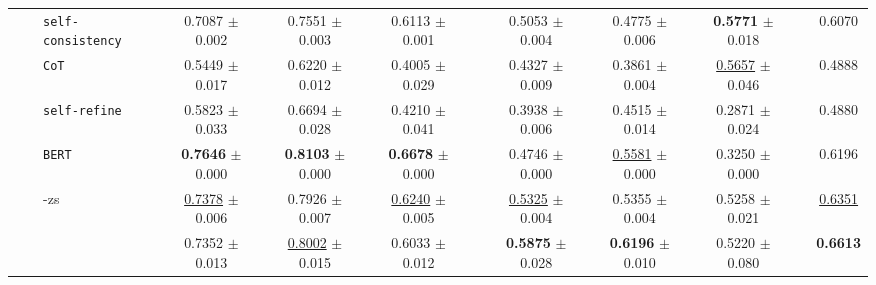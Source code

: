 \begin{table}[ht]
\begin{adjustbox}{max width=\textwidth}
\begin{tabular}{@{}l l l ccc p{0.15cm} ccc p{0.15cm} c@{}}
        & & \cellcolor{altrow} \texttt{self-consistency}       & \cellcolor{altrow} 0.7087 {\tiny$\pm$ 0.002} & \cellcolor{altrow} 0.7551 {\tiny$\pm$ 0.003} & \cellcolor{altrow} 0.6113 {\tiny$\pm$ 0.001}  & & \cellcolor{altrow} 0.5053 {\tiny$\pm$ 0.004} & \cellcolor{altrow} 0.4775 {\tiny$\pm$ 0.006} & \cellcolor{altrow} \textbf{0.5771} {\tiny$\pm$ 0.018}  & & \cellcolor{avgall!85}0.6070 \\
        & & \cellcolor{white} \texttt{CoT}                    & \cellcolor{white} 0.5449 {\tiny$\pm$ 0.017} & \cellcolor{white} 0.6220 {\tiny$\pm$ 0.012} & \cellcolor{white} 0.4005 {\tiny$\pm$ 0.029}  & & \cellcolor{white} 0.4327 {\tiny$\pm$ 0.009} & \cellcolor{white} 0.3861 {\tiny$\pm$ 0.004} & \cellcolor{white} \underline{0.5657} {\tiny$\pm$ 0.046}  & & \cellcolor{avgall!85}0.4888 \\
        & & \cellcolor{altrow} \texttt{self-refine}            & \cellcolor{altrow} 0.5823 {\tiny$\pm$ 0.033} & \cellcolor{altrow} 0.6694 {\tiny$\pm$ 0.028} & \cellcolor{altrow} 0.4210 {\tiny$\pm$ 0.041}  & & \cellcolor{altrow} 0.3938 {\tiny$\pm$ 0.006} & \cellcolor{altrow} 0.4515 {\tiny$\pm$ 0.014} & \cellcolor{altrow} 0.2871 {\tiny$\pm$ 0.024}  & & \cellcolor{avgall!85}0.4880 \\
        & & \cellcolor{white} \texttt{BERT}                   & \cellcolor{white} \textbf{0.7646} {\tiny$\pm$ 0.000} & \cellcolor{white} \textbf{0.8103} {\tiny$\pm$ 0.000} & \cellcolor{white} \textbf{0.6678} {\tiny$\pm$ 0.000}  & & \cellcolor{white} 0.4746 {\tiny$\pm$ 0.000} & \cellcolor{white} \underline{0.5581} {\tiny$\pm$ 0.000} & \cellcolor{white} 0.3250 {\tiny$\pm$ 0.000}  & & \cellcolor{avgall!85}0.6196 \\
        & & \cellcolor{methodrow} \method{}-zs          & \cellcolor{methodrow} \underline{0.7378} {\tiny$\pm$ 0.006} & \cellcolor{methodrow} 0.7926 {\tiny$\pm$ 0.007} & \cellcolor{methodrow} \underline{0.6240} {\tiny$\pm$ 0.005}  & & \cellcolor{methodrow} \underline{0.5325} {\tiny$\pm$ 0.004} & \cellcolor{methodrow} 0.5355 {\tiny$\pm$ 0.004} & \cellcolor{methodrow} 0.5258 {\tiny$\pm$ 0.021}  & & \cellcolor{avgall!85}\underline{0.6351} \\
        & & \cellcolor{methodrow} \method{}                    & \cellcolor{methodrow} 0.7352 {\tiny$\pm$ 0.013} & \cellcolor{methodrow} \underline{0.8002} {\tiny$\pm$ 0.015} & \cellcolor{methodrow} 0.6033 {\tiny$\pm$ 0.012}  & & \cellcolor{methodrow} \textbf{0.5875} {\tiny$\pm$ 0.028} & \cellcolor{methodrow} \textbf{0.6196} {\tiny$\pm$ 0.010} & \cellcolor{methodrow} 0.5220 {\tiny$\pm$ 0.080}  & & \cellcolor{avgall!85}\textbf{0.6613} \\

\end{tabular}
\end{adjustbox}
\end{table}
